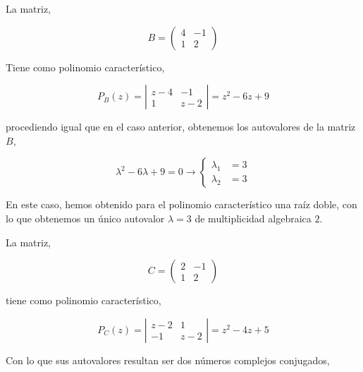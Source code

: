 \begin{paracol}{2}
La matriz,
\end{paracol}
\begin{equation*}
B=\begin{pmatrix}
4& -1\\
1& 2
\end{pmatrix}
\end{equation*}
\begin{paracol}{2}
Tiene como polinomio característico,
\end{paracol}
\begin{equation*}
P_B(z)=\left\vert\begin{matrix}
z-4& -1\\
1& z-2 
\end{matrix} \right\vert=z^2-6z+9
\end{equation*}
\begin{paracol}{2}
procediendo igual que en el caso anterior, obtenemos los autovalores de la matriz $B$,
\end{paracol}
\begin{equation*}
\lambda^2-6\lambda+9=0 \rightarrow \left\{ 
\begin{aligned}
\lambda_1&=3\\
\lambda_2&=3
\end{aligned}
\right.
\end{equation*}
\begin{paracol}{2}
En este caso, hemos obtenido para el polinomio característico una raíz doble, con lo que obtenemos un único autovalor $\lambda=3$ de multiplicidad algebraica $2$.

La matriz,
\end{paracol}
\begin{equation*}
C=\begin{pmatrix}
2& -1\\
1& 2
\end{pmatrix}
\end{equation*}
\begin{paracol}{2}
tiene como polinomio característico,
\end{paracol}
\begin{equation*}
P_C(z)=\left\vert\begin{matrix}
z-2& 1\\
-1& z-2 
\end{matrix} \right\vert=z^2-4z+5
\end{equation*}
\begin{paracol}{2}
Con lo que sus autovalores resultan ser dos números complejos conjugados,
\end{paracol}
